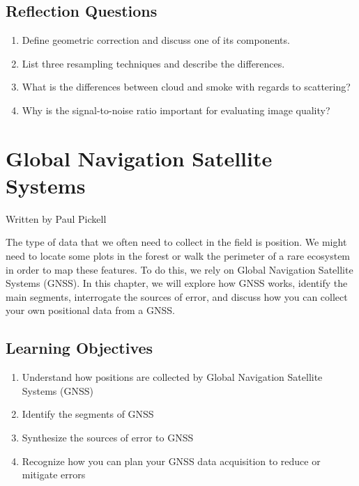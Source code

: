 \documentclass[
]{book}
\providecommand{\tightlist}{%
  \setlength{\itemsep}{0pt}\setlength{\parskip}{0pt}}
\begin{document}
\hypertarget{reflection-questions-9}{%
\section*{Reflection Questions}\label{reflection-questions-9}}

\begin{enumerate}
\def\labelenumi{\arabic{enumi}.}
\tightlist
\item
  Define geometric correction and discuss one of its components.
\item
  List three resampling techniques and describe the differences.
\item
  What is the differences between cloud and smoke with regards to scattering?
\item
  Why is the signal-to-noise ratio important for evaluating image quality?
\end{enumerate}

\hypertarget{global-navigation-satellite-systems}{%
\chapter{Global Navigation Satellite Systems}\label{global-navigation-satellite-systems}}

Written by
Paul Pickell

The type of data that we often need to collect in the field is position. We might need to locate some plots in the forest or walk the perimeter of a rare ecosystem in order to map these features. To do this, we rely on Global Navigation Satellite Systems (GNSS). In this chapter, we will explore how GNSS works, identify the main segments, interrogate the sources of error, and discuss how you can collect your own positional data from a GNSS.

\hypertarget{learning-objectives-13}{%
\section*{Learning Objectives}\label{learning-objectives-13}}

\begin{enumerate}
\def\labelenumi{\arabic{enumi}.}
\tightlist
\item
  Understand how positions are collected by Global Navigation Satellite Systems (GNSS)
\item
  Identify the segments of GNSS
\item
  Synthesize the sources of error to GNSS
\item
  Recognize how you can plan your GNSS data acquisition to reduce or mitigate errors
\end{enumerate}
\end{document}
